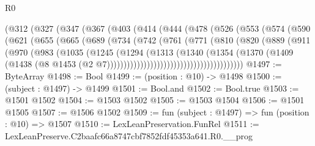 \begin{lexlean}{R0}
\begin{coremodule}
            (@312
              (@327
                (@347
                  (@367
                    (@403
                      (@414
                        (@444
                          (@478
                            (@526
                              (@553
                                (@574
                                  (@590
                                    (@621
                                      (@655
                                        (@665
                                          (@689
                                            (@734
                                              (@742
                                                (@761
                                                  (@771
                                                    (@810
                                                      (@820
                                                        (@889
                                                          (@911
                                                            (@970
                                                              (@983
                                                                (@1035
                                                                  (@1245
                                                                    (@1294
                                                                      (@1313
                                                                        (@1340
                                                                          (@1354
                                                                            (@1370
                                                                              (@1409
                                                                                (@1438
                                                                                  (@8
                                                                                    @1453
                                                                                    (@2
                                                                                      @7)))))))))))))))))))))))))))))))))))))))))
@1497 := ByteArray
@1498 := Bool
@1499 := (position : @10) -> @1498
@1500 := (subject : @1497) -> @1499
@1501 := Bool.and
@1502 := Bool.true
@1503 := @1501 @1502
@1504 := @1503 @1502
@1505 := @1503 @1504
@1506 := @1501 @1505
@1507 := @1506 @1502
@1509 := fun (subject : @1497) => fun (position : @10) => @1507
@1510 := LexLeanPreservation.FunRel
@1511 := LexLeanPreserve.C2baafc66a8747cbf7852fdf45353a641.R0.__prog

\end{coremodule}
\end{lexlean}
